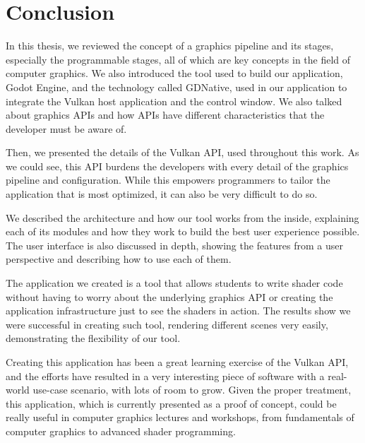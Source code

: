 \chapter{Conclusion}
In this thesis, we reviewed the concept of a graphics pipeline and its stages, especially the programmable stages, all of which are key concepts in the field of computer graphics. We also introduced the tool used to build our application, Godot Engine, and the technology called GDNative, used in our application to integrate the Vulkan host application and the control window. We also talked about graphics APIs and how APIs have different characteristics that the developer must be aware of.

Then, we presented the details of the Vulkan API, used throughout this work. As we could see, this API burdens the developers with every detail of the graphics pipeline and configuration. While this empowers programmers to tailor the application that is most optimized, it can also be very difficult to do so.

We described the architecture and how our tool works from the inside, explaining each of its modules and how they work to build the best user experience possible. The user interface is also discussed in depth, showing the features from a user perspective and describing how to use each of them.

The application we created is a tool that allows students to write shader code without having to worry about the underlying graphics API or creating the application infrastructure just to see the shaders in action. The results show we were successful in creating such tool, rendering different scenes very easily, demonstrating the flexibility of our tool.

Creating this application has been a great learning exercise of the Vulkan API, and the efforts have resulted in a very interesting piece of software with a real-world use-case scenario, with lots of room to grow. Given the proper treatment, this application, which is currently presented as a proof of concept, could be really useful in computer graphics lectures and workshops, from fundamentals of computer graphics to advanced shader programming.
